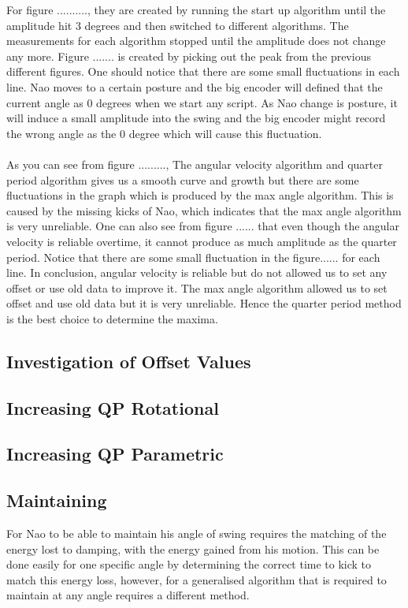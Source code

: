 \documentclass[11pt]{article}
\newcommand*\ruleline[1]{\par\noindent\raisebox{.8ex}{\makebox[\linewidth]{\hrulefill\hspace{1ex}\raisebox{-.8ex}{#1}\hspace{1ex}\hrulefill}}}
\begin{document}
\ruleline{Chenglong Li}
For figure .........., they are created by running the start up algorithm until the amplitude hit 3 degrees and then switched to different algorithms. The measurements for each algorithm stopped until the amplitude does not change any more. Figure ....... is created by picking out the peak from the previous different figures. One should notice that there are some small fluctuations in each line. Nao moves to a certain posture and the big encoder will defined that the current angle as 0 degrees when we start any script. As Nao change is posture, it will induce a small amplitude into the swing and the big encoder might record the wrong angle as the 0 degree which will cause this fluctuation.  
\\
\\
As you can see from figure ........., The angular velocity algorithm and quarter period algorithm gives us a smooth curve and growth but there are some fluctuations in the graph which is  produced by the max angle algorithm. This is caused by the missing kicks of Nao, which indicates that the max angle algorithm is very unreliable. One can also see from figure ...... that even though the angular velocity is reliable overtime, it cannot produce as much amplitude as the quarter period. Notice that there are some small fluctuation in the figure...... for each line.  In conclusion, angular velocity is reliable but do not allowed us to set any offset or use old data to improve it. The max angle algorithm allowed us to set offset and use old data but it is very unreliable. Hence the quarter period method is the best choice to determine the maxima.  
\subsection{Investigation of Offset Values}
\ruleline{David Thomas}

\subsection{Increasing QP Rotational}\label{sec:Increasing QP Rotational}
\subsection{Increasing QP Parametric}
\subsection{Maintaining}
\ruleline{George Sheppard}
For Nao to be able to maintain his angle of swing requires the matching of the energy lost to damping, with the energy gained from his motion. This can be done easily for one specific angle by determining the correct time to kick to match this energy loss, however, for a generalised algorithm that is required to maintain at any angle requires a different method.\\
\end{document}
